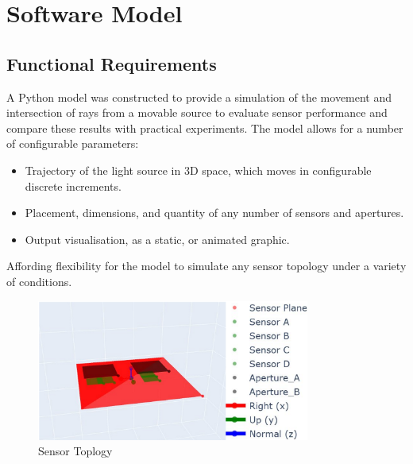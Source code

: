 \section{Software Model}
\label{sec:softwareModel}

\subsection{Functional Requirements}

A Python model was constructed to provide a simulation of the movement and intersection of rays from a movable source to evaluate sensor performance and compare these results with practical experiments.
The model allows for a number of configurable parameters:
\begin{itemize}
    \item Trajectory of the light source in 3D space, which moves in configurable discrete increments.
    \item Placement, dimensions, and quantity of any number of sensors and apertures.
    \item Output visualisation, as a static, or animated graphic.
\end{itemize}
Affording flexibility for the model to simulate any sensor topology under a variety of conditions.

\begin{figure}[htbp] %
    \centering
    \includegraphics[width=0.8\textwidth]{chapters/methodology/SoftwareModel/images/Sensor plane.png} %
    \caption{Sensor Toplogy}       %
    \label{fig:Sensor Topology}            %
\end{figure}                             %







